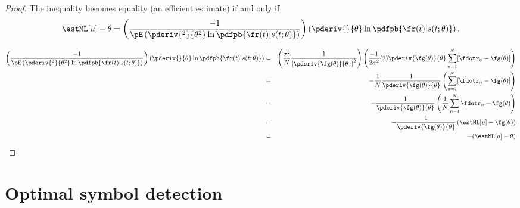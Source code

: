 \begin{proof}
The inequality becomes equality (an efficient estimate) 
if and only if
\[ \estML[u] - \theta = 
   \left( \frac{-1}{\pE\left(
              \pderiv{^2}{\theta^2} \ln \pdfpb{\fr(t)|s(t;\theta)}
           \right)} \right)
   \left(\pderiv{}{\theta} \ln \pdfpb{\fr(t)|s(t;\theta)} \right).
\]

\begin{eqnarray*}
   \left( \frac{-1}{\pE\left(
              \pderiv{^2}{\theta^2} \ln \pdfpb{\fr(t)|s(t;\theta)}
           \right)} \right)
   \left(\pderiv{}{\theta} \ln \pdfpb{\fr(t)|s(t;\theta)} \right)
     &=& \left(
         \frac{\sigma^2}{N}
           \frac{1}{\left[ \pderiv{\fg(\theta)}{\theta} \right]^2} \right)
         \left(\frac{-1}{2\sigma^2}(2)\pderiv{\fg(\theta)}{\theta}
         \sum_{n=1}^N [\fdotr_n - \fg(\theta) ]\right)
   \\&=& -\frac{1}{N}
         \frac{1}{\pderiv{\fg(\theta)}{\theta}}
         \left(\sum_{n=1}^N [\fdotr_n - \fg(\theta) ] \right)
   \\&=& -\frac{1}{\pderiv{\fg(\theta)}{\theta}}
         \left(\frac{1}{N}\sum_{n=1}^N \fdotr_n - \fg(\theta) \right)
   \\&=& -\frac{1}{\pderiv{\fg(\theta)}{\theta}}
         \left(\estML[u] - \fg(\theta) \right)
   \\&=& -(\estML[u] - \theta)
\end{eqnarray*}
\end{proof}



\section{Optimal symbol detection}
